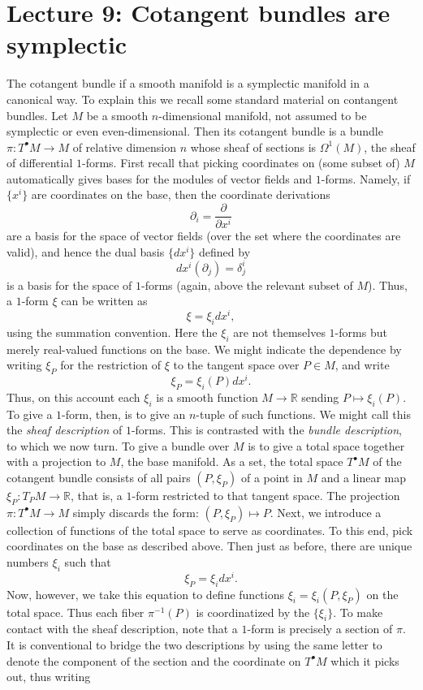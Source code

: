 \documentclass[11pt]{article} %
\begin{document}
\section*{Lecture 9: Cotangent bundles are symplectic}
The cotangent bundle if a smooth manifold is a symplectic manifold in a canonical way. To explain this we recall some standard material on contangent bundles. Let $M$ be a smooth $n$-dimensional manifold, not assumed to be symplectic or even even-dimensional. Then its cotangent bundle is a bundle $\pi:T^\bullet M \rightarrow M$ of relative dimension $n$ whose sheaf of sections is $\Omega^1(M)$, the sheaf of differential $1$-forms. First recall that picking coordinates on (some subset of) $M$ automatically gives bases for the modules of vector fields and $1$-forms. Namely, if $\{x^i\}$ are coordinates on the base, then the coordinate derivations
$$
\partial_i = \frac{\partial}{\partial x^i}
$$
are a basis for the space of vector fields (over the set where the coordinates are valid), and hence the dual basis $\{dx^i\}$ defined by
$$
dx^i(\partial_j) = \delta^i_j
$$
is a basis for the space of $1$-forms (again, above the relevant subset of $M$). Thus, a $1$-form $\xi$ can be written as 
$$
\xi = \xi_i dx^i,
$$
using the summation convention. Here the $\xi_i$ are not themselves $1$-forms but merely real-valued functions on the base. We might indicate the dependence by writing $\xi_P$ for the restriction of $\xi$ to the tangent space over $P\in M$, and write
$$
\xi_P = \xi_i(P) dx^i.
$$
Thus, on this account each $\xi_i$ is a smooth function $M \rightarrow \mathbb{R}$ sending $P \mapsto \xi_i (P)$. To give a $1$-form, then, is to give an $n$-tuple of such functions. We might call this the \emph{sheaf description} of $1$-forms. This is contrasted with the \emph{bundle description}, to which we now turn. To give a bundle over $M$ is to give a total space together with a projection to $M$, the base manifold. As a set, the total space $T^\bullet M$ of the cotangent bundle consists of all pairs $(P, \xi_P)$ of a point in $M$ and a linear map $\xi_P: T_PM \rightarrow \mathbb{R}$, that is, a $1$-form restricted to that tangent space. The projection $\pi: T^\bullet M \rightarrow M$ simply discards the form: $(P, \xi_P)\mapsto P$. Next, we introduce a collection of functions of the total space to serve as coordinates. To this end, pick coordinates on the base as described above. Then just as before, there are unique numbers $\xi_i$ such that
$$
\xi_P = \xi_i dx^i.
$$
Now, however, we take this equation to define functions $\xi_i = \xi_i(P, \xi_P)$ on the total space. Thus each fiber $\pi^{-1}(P)$ is coordinatized by the $\{\xi_i\}$. To make contact with the sheaf description, note that a $1$-form is precisely a section of $\pi$. It is conventional to bridge the two descriptions by using the same letter to denote the component of the section and the coordinate on $T^\bullet M$ which it picks out, thus writing
\end{document}
